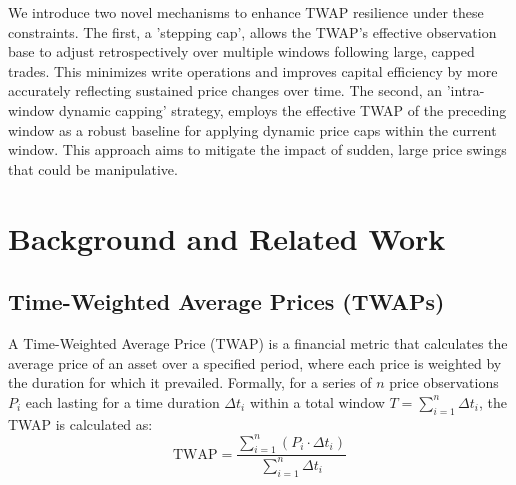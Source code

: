 \documentclass{article}
\begin{document}
We introduce two novel mechanisms to enhance TWAP resilience under these constraints. The first, a 'stepping cap', allows the TWAP's effective observation base to adjust retrospectively over multiple windows following large, capped trades. This minimizes write operations and improves capital efficiency by more accurately reflecting sustained price changes over time. The second, an 'intra-window dynamic capping' strategy, employs the effective TWAP of the preceding window as a robust baseline for applying dynamic price caps within the current window. This approach aims to mitigate the impact of sudden, large price swings that could be manipulative.

\section{Background and Related Work}
\label{sec:background}
\subsection{Time-Weighted Average Prices (TWAPs)}
A Time-Weighted Average Price (TWAP) is a financial metric that calculates the average price of an asset over a specified period, where each price is weighted by the duration for which it prevailed. Formally, for a series of $n$ price observations $P_i$ each lasting for a time duration $\Delta t_i$ within a total window $T = \sum_{i=1}^{n} \Delta t_i$, the TWAP is calculated as:
\[ \text{TWAP} = \frac{\sum_{i=1}^{n} (P_i \cdot \Delta t_i)}{\sum_{i=1}^{n} \Delta t_i} \]
\end{document}
